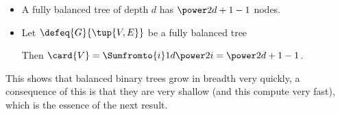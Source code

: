 \begin{module}[id=bbt-size]
\begin{frame}
\begin{itemize}
\begin{sproof}[id=size-lemma-pf,proofend=,for=size-lemma]{via induction over the depth $i$.}
\begin{spfcases}{We have to consider two cases}
\begin{spfcase}{$i>0$}
\begin{spfstep}
           As $G$ is  and $\gdepth{G}=n>i$, $\livar{V}{i-1}$ cannot contain
            leaves.
          \end{spfstep}
          \begin{spfstep}[type=conclusion]
           Thus $\eq{\card{\livar{V}i},{\atimes[cdot]{2,\card{\livar{V}{i-1}}}},{\atimes[cdot]{2,\power2{i-1}}},\power2i}$.
          \end{spfstep}
        \end{spfcase}
      \end{spfcases}
    \end{sproof}
  \item 
    \begin{assertion}[id=fbbt,type=corollary]	
      A fully balanced tree of depth $d$ has $\power2{d+1}-1$ nodes.
    \end{assertion}
  \item
      \begin{sproof}[for=fbbt,id=fbbt-pf]{}
        \begin{spfstep}
          Let $\defeq{G}{\tup{V,E}}$ be a fully balanced tree
        \end{spfstep}
        \begin{spfstep}
          Then $\card{V}=\Sumfromto{i}1d{\power2i}= \power2{d+1}-1$.
        \end{spfstep}
      \end{sproof}
    \end{itemize}
  \end{frame}
\begin{note}
  \begin{omtext}[type=conclusion,for=binary-tree]
    This shows that balanced binary trees grow in breadth very quickly, a consequence of
    this is that they are very shallow (and this compute very fast), which is the essence of
    the next result.
  \end{omtext}
\end{note}
\end{module}

